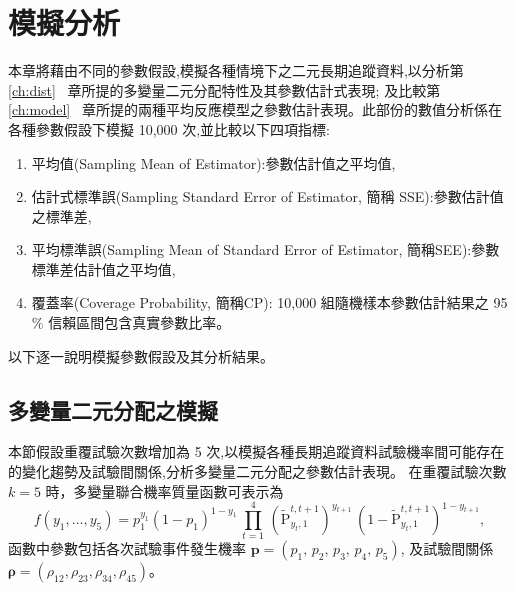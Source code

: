 %
%

\chapter{模擬分析}\label{ch:simu}
\noindent 本章將藉由不同的參數假設,模擬各種情境下之二元長期追蹤資料,以分析第~ \ref{ch:dist} ~章所提的多變量二元分配特性及其參數估計式表現;
及比較第~ \ref{ch:model} ~章所提的兩種平均反應模型之參數估計表現。此部份的數值分析係在各種參數假設下模擬 10,000 次,並比較以下四項指標:
\begin{enumerate}
  \item 平均值(Sampling Mean of Estimator):參數估計值之平均值,
  \item 估計式標準誤(Sampling Standard Error of Estimator, 簡稱 SSE):參數估計值之標準差,
  \item 平均標準誤(Sampling Mean of Standard Error of Estimator, 簡稱SEE):參數標準差估計值之平均值,
  \item 覆蓋率(Coverage Probability, 簡稱CP): 10,000 組隨機樣本參數估計結果之 95$\%$ 信賴區間包含真實參數比率。
\end{enumerate}
以下逐一說明模擬參數假設及其分析結果。

\section{多變量二元分配之模擬}\label{sec:simuDist}
本節假設重覆試驗次數增加為 5 次,以模擬各種長期追蹤資料試驗機率間可能存在的變化趨勢及試驗間關係,分析多變量二元分配之參數估計表現。
在重覆試驗次數 $k=5$ 時，多變量聯合機率質量函數可表示為
\[ f(y_1,\ldots,y_5) = p_1^{y_1} (1-p_1)^{1-y_1} \, \prod_{t=1}^{4} \, (\tilde{\mbox{P}}^{t,t+1}_{y_t,1})^{y_{t+1}} \, (1-\tilde{\mbox{P}}^{t,t+1}_{y_t,1})^{1-y_{t+1}},
\]
函數中參數包括各次試驗事件發生機率 $\bm{p}=(p_1,\,p_2,\,p_3,\,p_4,\,p_5)$, 及試驗間關係 $\bm{\rho}=(\rho_{12}, \rho_{23}, \rho_{34}, \rho_{45})$。

